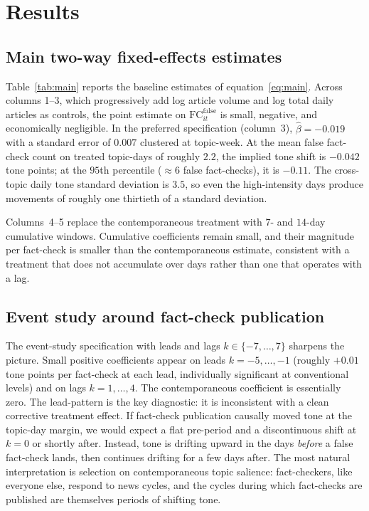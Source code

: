 \documentclass[12pt]{article}
\begin{document}
\section{Results}

\subsection{Main two-way fixed-effects estimates}

Table~\ref{tab:main} reports the baseline estimates of equation~\eqref{eq:main}. Across columns 1--3, which progressively add log article volume and log total daily articles as controls, the point estimate on $\mathrm{FC}^{\text{false}}_{it}$ is small, negative, and economically negligible. In the preferred specification (column~3), $\hat\beta = -0.019$ with a standard error of $0.007$ clustered at topic-week. At the mean false fact-check count on treated topic-days of roughly $2.2$, the implied tone shift is $-0.042$ tone points; at the $95$th percentile ($\approx 6$ false fact-checks), it is $-0.11$. The cross-topic daily tone standard deviation is $3.5$, so even the high-intensity days produce movements of roughly one thirtieth of a standard deviation.



Columns~4--5 replace the contemporaneous treatment with $7$- and $14$-day cumulative windows. Cumulative coefficients remain small, and their magnitude per fact-check is smaller than the contemporaneous estimate, consistent with a treatment that does not accumulate over days rather than one that operates with a lag.

\subsection{Event study around fact-check publication}

The event-study specification with leads and lags $k \in \{-7,\ldots,7\}$ sharpens the picture. Small positive coefficients appear on leads $k=-5,\ldots,-1$ (roughly $+0.01$ tone points per fact-check at each lead, individually significant at conventional levels) and on lags $k=1,\ldots,4$. The contemporaneous coefficient is essentially zero. The lead-pattern is the key diagnostic: it is inconsistent with a clean corrective treatment effect. If fact-check publication causally moved tone at the topic-day margin, we would expect a flat pre-period and a discontinuous shift at $k=0$ or shortly after. Instead, tone is drifting upward in the days \emph{before} a false fact-check lands, then continues drifting for a few days after. The most natural interpretation is selection on contemporaneous topic salience: fact-checkers, like everyone else, respond to news cycles, and the cycles during which fact-checks are published are themselves periods of shifting tone.
\end{document}
